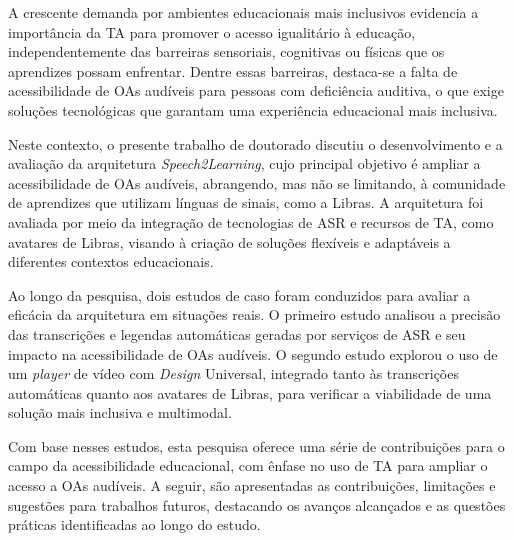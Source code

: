
A crescente demanda por ambientes educacionais mais inclusivos evidencia a importância da TA para promover o acesso igualitário à educação, independentemente das barreiras sensoriais, cognitivas ou físicas que os aprendizes possam enfrentar. Dentre essas barreiras, destaca-se a falta de acessibilidade de OAs audíveis para pessoas com deficiência auditiva, o que exige soluções tecnológicas que garantam uma experiência educacional mais inclusiva.

Neste contexto, o presente trabalho de doutorado discutiu o desenvolvimento e a avaliação da arquitetura \textit{Speech2Learning}, cujo principal objetivo é ampliar a acessibilidade de OAs audíveis, abrangendo, mas não se limitando, à comunidade de aprendizes que utilizam línguas de sinais, como a Libras. A arquitetura foi avaliada por meio da integração de tecnologias de ASR e recursos de TA, como avatares de Libras, visando à criação de soluções flexíveis e adaptáveis a diferentes contextos educacionais.

Ao longo da pesquisa, dois estudos de caso foram conduzidos para avaliar a eficácia da arquitetura em situações reais. O primeiro estudo analisou a precisão das transcrições e legendas automáticas geradas por serviços de ASR e seu impacto na acessibilidade de OAs audíveis. O segundo estudo explorou o uso de um \textit{player} de vídeo com \textit{Design} Universal, integrado tanto às transcrições automáticas quanto aos avatares de Libras, para verificar a viabilidade de uma solução mais inclusiva e multimodal.

Com base nesses estudos, esta pesquisa oferece uma série de contribuições para o campo da acessibilidade educacional, com ênfase no uso de TA para ampliar o acesso a OAs audíveis. A seguir, são apresentadas as contribuições, limitações e sugestões para trabalhos futuros, destacando os avanços alcançados e as questões práticas identificadas ao longo do estudo.

